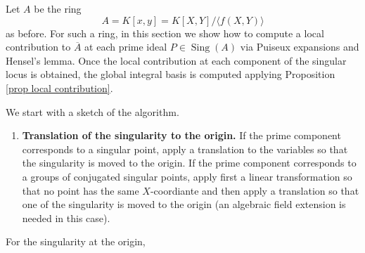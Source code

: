 \documentclass[a4paper,11pt]{amsart}%
\theoremstyle{definition}
\theoremstyle{plain}
\theoremstyle{remark}
\DeclareMathOperator{\Sing}{Sing}
\begin{document}
Let $A$ be the ring 
\[
A=K[x,y]=K[X,Y]/\langle f(X,Y)\rangle
\]
as before. For such a ring, in this section we
show how to compute a local contribution to $\overline{A}$ at each prime ideal
$P\in\Sing(A)$ via Puiseux expansions and Hensel's lemma.
Once the local contribution at each component of the singular locus is
obtained, the global integral basis is computed applying Proposition
\ref{prop local contribution}.


We start with a sketch of the algorithm.

\begin{enumerate}
\item \textbf{Translation of the singularity to the origin.} If the prime
component corresponds to a singular point, apply a translation to the
variables so that the singularity is moved to the origin. If the prime
component corresponds to a groups of conjugated singular points, apply first a
linear transformation so that no point has the same $X$-coordiante and then
apply a translation so that one of the singularity is moved to the origin (an
algebraic field extension is needed in this case).
\end{enumerate}

For the singularity at the origin,
\end{document}
